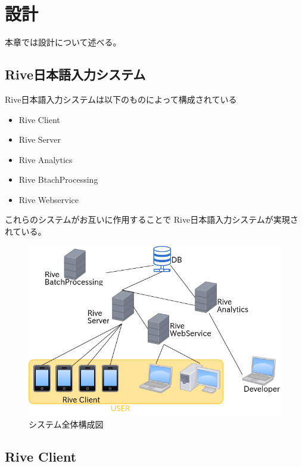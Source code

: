 \chapter{設計}
\label{chap:design}
本章では設計について述べる。

\newpage
\section{Rive日本語入力システム}
Rive日本語入力システムは以下のものによって構成されている

\begin{itemize}
  \item Rive Client
  \item Rive Server
  \item Rive Analytics
  \item Rive BtachProcessing
  \item Rive Webservice
\end{itemize}

これらのシステムがお互いに作用することで
Rive日本語入力システムが実現されている。

\begin{figure}[htbp]
  \begin{center}
    \includegraphics[width=12cm,bb=0 0 540 448]{images/systemstructure.png}
  \end{center}
  \caption{システム全体構成図}
  \label{fig:systemstructure}
\end{figure}



\section{Rive Client}
